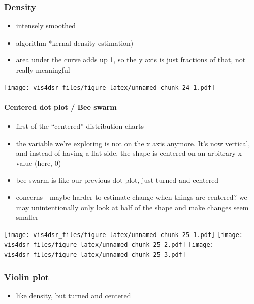 \documentclass[
]{krantz}
\providecommand{\tightlist}{%
  \setlength{\itemsep}{0pt}\setlength{\parskip}{0pt}}
\begin{document}
\hypertarget{density}{%
\subsubsection{Density}\label{density}}

\begin{itemize}
\tightlist
\item
  intensely smoothed
\item
  algorithm *kernal density estimation)
\item
  area under the curve adds up 1, so the y axis is just fractions of that, not
  really meaningful
\end{itemize}

\texttt{[image: vis4dsr\_files/figure-latex/unnamed-chunk-24-1.pdf]}

\hypertarget{centered-dot-plot-bee-swarm}{%
\paragraph{Centered dot plot / Bee swarm}\label{centered-dot-plot-bee-swarm}}

\begin{itemize}
\tightlist
\item
  first of the ``centered'' distribution charts
\item
  the variable we're exploring is not on the x axis anymore. It's now vertical,
  and instead of having a flat side, the shape is centered on an arbitrary x value (here, 0)
\item
  bee swarm is like our previous dot plot, just turned and centered
\item
  concerns - maybe harder to estimate change when things are centered? we may unintentionally
  only look at half of the shape and make changes seem smaller
\end{itemize}

\texttt{[image: vis4dsr\_files/figure-latex/unnamed-chunk-25-1.pdf]} \texttt{[image: vis4dsr\_files/figure-latex/unnamed-chunk-25-2.pdf]} \texttt{[image: vis4dsr\_files/figure-latex/unnamed-chunk-25-3.pdf]}

\hypertarget{violin-plot}{%
\subsubsection{Violin plot}\label{violin-plot}}

\begin{itemize}
\tightlist
\item
  like density, but turned and centered
\end{itemize}
\end{document}
